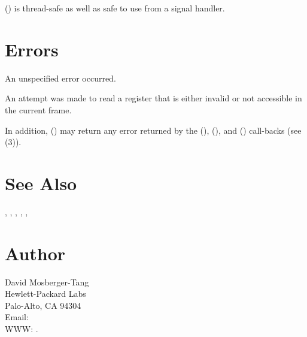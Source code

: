 \documentclass{article}
\begin{document}
() is thread-safe as well as safe to use
from a signal handler.

\section{Errors}

\begin{Description}
\item[\Const{UNW\_EUNSPEC}] An unspecified error occurred.
\item[\Const{UNW\_EBADREG}] An attempt was made to read a register
  that is either invalid or not accessible in the current frame.
\end{Description}
In addition, () may return any error returned by
the (), (), and
() call-backs (see
(3)).

\section{See Also}

,
,
,
,
,

\section{Author}

\noindent
David Mosberger-Tang\\
Hewlett-Packard Labs\\
Palo-Alto, CA 94304\\
Email: \\
WWW: .
\LatexManEnd
\end{document}
